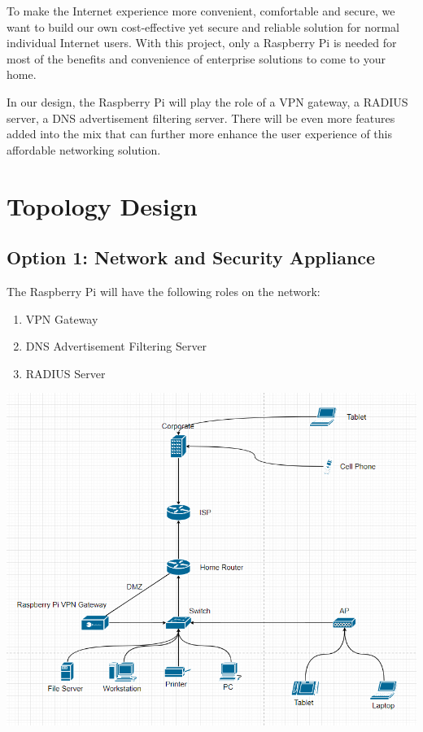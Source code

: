 \documentclass[12pt]{article}
\begin{document}
To make the Internet experience more convenient, comfortable and secure, we want to build our own cost-effective yet secure and reliable solution for normal individual Internet users. With this project, only a Raspberry Pi is needed for most of the benefits and convenience of enterprise solutions to come to your home.

In our design, the Raspberry Pi will play the role of a VPN gateway, a RADIUS server, a DNS advertisement filtering server. There will be even more features added into the mix that can further more enhance the user experience of this affordable networking solution.

\vfill

\section{Topology Design}

\subsection{Option 1: Network and Security Appliance}

The Raspberry Pi will have the following roles on the network:

\begin{enumerate}
\item VPN Gateway
\item DNS Advertisement Filtering Server
\item RADIUS Server
\end{enumerate}

\begin{center}
\includegraphics[scale=0.6]{topology.png}\\[1cm]
\end{center}
\end{document}
